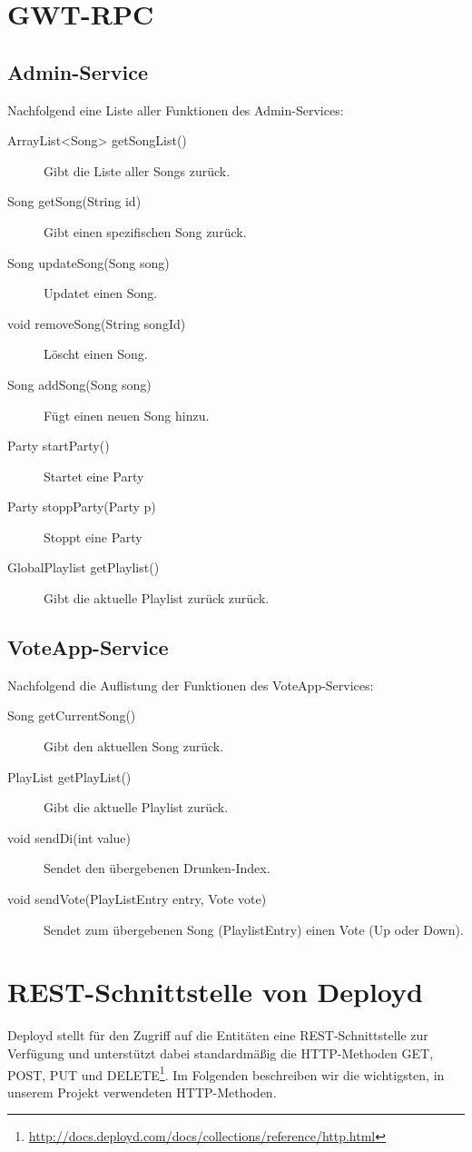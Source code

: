 \section{GWT-RPC}

\subsection{Admin-Service}
Nachfolgend eine Liste aller Funktionen des Admin-Services:
\begin{description}
	\item[ArrayList<Song> getSongList()] Gibt die Liste aller Songs zurück.
	\item[Song getSong(String id)] Gibt einen spezifischen Song zurück.
	\item[Song updateSong(Song song)] Updatet einen Song.
	\item[void removeSong(String songId)]	Löscht einen Song.
	\item[Song addSong(Song song)] Fügt einen neuen Song hinzu.
	\item[Party startParty()]	Startet eine Party
	\item[Party stoppParty(Party p)] Stoppt eine Party
	\item[GlobalPlaylist getPlaylist()] Gibt die aktuelle Playlist zurück zurück.
\end{description}


\subsection{VoteApp-Service}
Nachfolgend die Auflistung der Funktionen des VoteApp-Services:
\begin{description}
	\item[Song getCurrentSong()] Gibt den aktuellen Song zurück.
	\item[PlayList getPlayList()]	Gibt die aktuelle Playlist zurück.
	\item[void sendDi(int value)] Sendet den übergebenen Drunken-Index.
	\item[void sendVote(PlayListEntry entry, Vote vote)] Sendet zum übergebenen Song (PlaylistEntry) einen Vote (Up oder Down).
\end{description}

\section{REST-Schnittstelle von Deployd}
\label{anh:rest}
Deployd stellt für den Zugriff auf die Entitäten eine REST-Schnittstelle zur Verfügung und unterstützt dabei standardmäßig die HTTP-Methoden GET, POST, PUT und DELETE\footnote{\url{http://docs.deployd.com/docs/collections/reference/http.html}}. Im Folgenden beschreiben wir die wichtigsten, in unserem Projekt verwendeten HTTP-Methoden.

